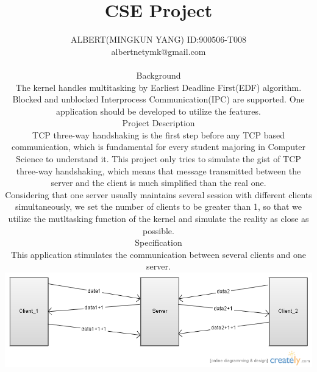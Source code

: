 \documentclass{report}
\begin{document}
\title{CSE Project}
\author{ALBERT(MINGKUN YANG) ID:900506-T008\\
albertnetymk@gmail.com\\
\maketitle 

\section{Background}
The kernel handles multitasking by Earliest Deadline First(EDF) algorithm. Blocked and unblocked Interprocess Communication(IPC) are supported. One application should be developed to utilize the features.

\section{Project Description}
TCP three-way handshaking is the first step before any TCP based communication, which is fundamental for every student majoring in Computer Science to understand it. This project only tries to simulate the gist of TCP three-way handshaking, which means that message transmitted between the server and the client is much simplified than the real one.

Considering that one server usually maintains several session with different clients simultaneously, we set the number of clients to be greater than 1, so that we utilize the mutltasking function of the kernel and simulate the reality as close as possible.
\section{Specification}
This application stimulates the communication between several clients and one server.

\begin{figure}[p]
  \includegraphics[scale=0.5]{handshaking.png}
  \caption{two clients and one server}
\end{figure}

}
\end{document}
